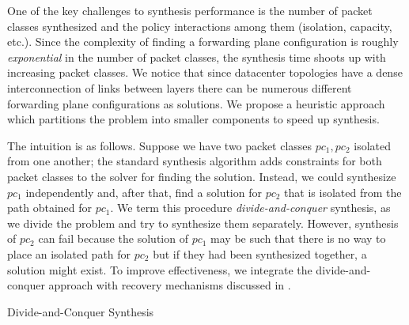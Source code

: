 One of the key challenges to synthesis performance is the number
of packet classes synthesized and the policy interactions among them
(isolation, capacity, etc.). Since the complexity of finding a
forwarding plane configuration is roughly \emph{exponential} in the
number of packet classes, the synthesis time shoots up with increasing
packet classes. 
We notice that since datacenter topologies have a dense interconnection of
links between layers there can be
numerous different forwarding plane configurations as solutions.
We propose a heuristic approach which partitions the problem 
into smaller components to speed up synthesis.

The intuition is as follows. Suppose we have two packet classes $pc_1,
pc_2$ isolated from one another; the standard synthesis algorithm adds 
constraints for both packet classes to the solver for finding the solution.
Instead, we could synthesize $pc_1$
independently and, after that, find a solution for $pc_2$ 
that is isolated from the
path obtained for $pc_1$. We term this
procedure \emph{divide-and-conquer} synthesis, as we divide
the problem and try to synthesize them separately.
However, synthesis of $pc_2$ can fail because the solution
of $pc_1$ may be such that there is no way to place an isolated path for
$pc_2$ but if they had been synthesized together, a
solution might exist. To improve effectiveness, we integrate the 
divide-and-conquer approach with recovery 
mechanisms discussed in .

\begin{algorithm}[h]

	\caption{Divide-and-Conquer Synthesis}
	\label{dcsyn}
	\begin{algorithmic}[1]
		\Else
		  \EndIf
		 \label{lst:line:solrecstart}
		  \EndIf
		\Else
		\EndIf
		\EndWhile \label{lst:line:solrecend}
		\EndIf
		\EndProcedure
	\end{algorithmic}

\end{algorithm}

